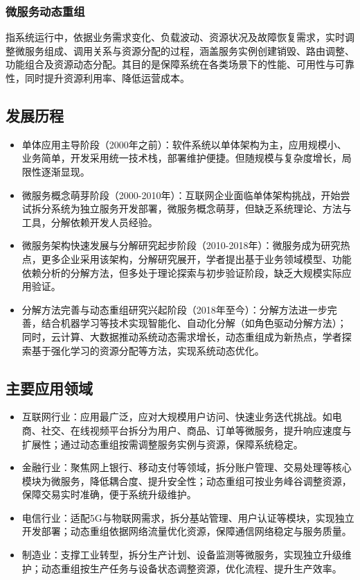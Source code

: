\documentclass[lang=cn,11pt,a4paper,cite=number]{elegantpaper}
\begin{document}
\subsubsection{微服务动态重组}
\label{sec:x1-1-1}
指系统运行中，依据业务需求变化、负载波动、资源状况及故障恢复需求，实时调整微服务组成、调用关系与资源分配的过程，涵盖服务实例创建销毁、路由调整、功能组合及资源动态分配。其目的是保障系统在各类场景下的性能、可用性与可靠性，同时提升资源利用率、降低运营成本。
\subsection{发展历程}
\begin{itemize}
  \item 单体应用主导阶段（2000年之前）：软件系统以单体架构为主，应用规模小、业务简单，开发采用统一技术栈，部署维护便捷。但随规模与复杂度增长，局限性逐渐显现。
  \item 微服务概念萌芽阶段（2000-2010年）：互联网企业面临单体架构挑战，开始尝试拆分系统为独立服务开发部署，微服务概念萌芽，但缺乏系统理论、方法与工具，分解依赖开发人员经验。
  \item 微服务架构快速发展与分解研究起步阶段（2010-2018年）：微服务成为研究热点，更多企业采用该架构，分解研究展开，学者提出基于业务领域模型、功能依赖分析的分解方法，但多处于理论探索与初步验证阶段，缺乏大规模实际应用验证。
  \item 分解方法完善与动态重组研究兴起阶段（2018年至今）：分解方法进一步完善，结合机器学习等技术实现智能化、自动化分解（如角色驱动分解方法）；同时，云计算、大数据推动系统动态需求增长，动态重组成为新热点，学者探索基于强化学习的资源分配等方法，实现系统动态优化。
\end{itemize}

\subsection{主要应用领域}
\begin{itemize}
  \item 互联网行业：应用最广泛，应对大规模用户访问、快速业务迭代挑战。如电商、社交、在线视频平台拆分为用户、商品、订单等微服务，提升响应速度与扩展性；通过动态重组按需调整服务实例与资源，保障系统稳定。
  \item 金融行业：聚焦网上银行、移动支付等领域，拆分账户管理、交易处理等核心模块为微服务，降低耦合度、提升安全性；动态重组可按业务峰谷调整资源，保障交易实时准确，便于系统升级维护。
  \item 电信行业：适配5G与物联网需求，拆分基站管理、用户认证等模块，实现独立开发部署；动态重组依据网络流量优化资源，保障通信网络稳定与服务质量。
  \item 制造业：支撑工业转型，拆分生产计划、设备监测等微服务，实现独立升级维护；动态重组按生产任务与设备状态调整资源，优化流程、提升生产效率。
\end{itemize}
\end{document}

